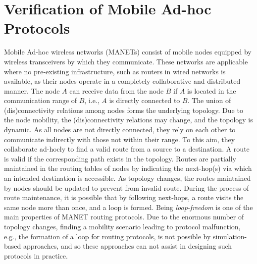\section{Verification of Mobile Ad-hoc Protocols}\label{sec::wrebeca} 
Mobile Ad-hoc wireless networks (MANETs) consist of mobile nodes equipped by wireless transceivers by which they communicate. These networks are applicable where no pre-existing infrastructure, such as routers in wired networks %
is available, as their nodes operate in a completely collaborative and distributed manner. The node $A$ can receive data from the node $B$ if $A$ is located in the communication range of $B$, i.e., $A$ is directly connected to $B$. The union of (dis)connectivity relations among nodes forms the underlying topology.  Due to the node mobility, the (dis)connectivity relations may change, and the topology is dynamic. As all nodes are not directly connected, they rely on each other to communicate indirectly with those not within their range. To this aim, they collaborate ad-hocly to find a valid route from a source to a destination. A route is valid if the corresponding path exists in the topology. Routes are partially maintained in the routing tables of nodes by indicating the next-hop(s) via which an intended destination is accessible. As topology changes, the routes maintained by nodes should be updated to prevent from invalid route.  During the process of route maintenance, it is possible that by following next-hops, a route visits the same node more than once, and a loop is formed. 
Being \emph{loop-freedom} is one of the main properties of MANET routing protocols. Due to the enormous number of topology changes, finding a mobility scenario leading to protocol malfunction, e.g., the formation of a loop for routing protocols, is not possible by simulation-based approaches, and so these approaches can not assist in designing such protocols in practice. %


